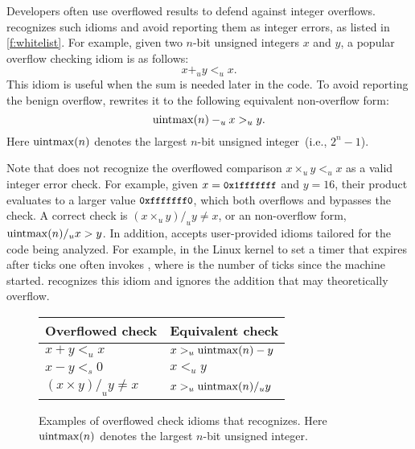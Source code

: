 Developers often use overflowed results to defend against integer
overflows.  \sys recognizes such idioms and avoid reporting them
as integer errors, as listed in \autoref{f:whitelist}.  For example,
given two $n$-bit unsigned integers $x$ and $y$, a popular overflow
checking idiom is as follows:
\begin{equation*}
x +_u y <_u x.
\end{equation*}
This idiom is useful when the sum is needed later in the code.
To avoid reporting the benign overflow,
\sys rewrites it to the following equivalent non-overflow form:
\begin{equation*}
\operatorname{uintmax}(n) -_u x >_u y.
\end{equation*}
Here $\operatorname{uintmax}(n)$ denotes the largest $n$-bit unsigned integer~(i.e.,
$2^n - 1$).

Note that \sys does not recognize the overflowed comparison $x
\times_u y <_u x$ as a valid integer error check.  For example,
given $x = \cc{0x1fffffff}$ and $y = 16$, their product evaluates
to a larger value $\cc{0xfffffff0}$, which both overflows and
bypasses the check.  A correct check is $(x \times_u y) /_u y \neq
x$, or an non-overflow form, $\operatorname{uintmax}(n) /_u x > y$.
In addition, \sys accepts user-provided idioms tailored for the
code being analyzed.  For example, in the Linux kernel to set a
timer that expires after  ticks one often invokes
, where  is the
number of ticks since the machine started.  \sys recognizes
this idiom and ignores the addition  that may
theoretically overflow.
\fi

\begin{figure}
\centering
\begin{tabular}{ll}
\toprule
Overflowed check & Equivalent check \\ \midrule
$x + y <_u x$ & $x >_u \operatorname{uintmax}(n) - y$ \\
$x - y <_s 0$ & $x <_u y$ \\
$(x \times y) /_u y \neq x$ & $x >_u \operatorname{uintmax}(n) /_u y$   \\
\bottomrule
\end{tabular}
\caption{Examples of overflowed check idioms that \sys recognizes.
Here $\operatorname{uintmax}(n)$ denotes the largest $n$-bit unsigned integer.}
\label{f:whitelist}
\end{figure}
